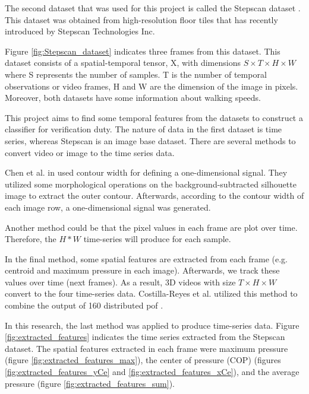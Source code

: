 The second dataset that was used for this project is called the Stepscan dataset \cite{Connor2015ComparingBiometrics}. This dataset was obtained from high-resolution floor tiles that has recently introduced by Stepscan Technologies Inc.

Figure \ref{fig:Stepscan_dataset} indicates three frames from this dataset. This dataset consists of a spatial-temporal tensor, X, with dimensions $S \times T \times H \times W$ where S represents the number of samples. T is the number of temporal observations or video frames, H and W are the dimension of the image in pixels. Moreover, both datasets have some information about walking speeds. 

This project aims to find some temporal features from the datasets to construct a classifier for verification duty. The nature of data in the first dataset is time series, whereas Stepscan is an image base dataset. There are several methods to convert video or image to the time series data.

Chen et al. in \cite{Chen2006GaitModel} used contour width  for defining a one-dimensional signal. They utilized some morphological operations on the background-subtracted silhouette image to extract the outer contour. Afterwards, according to the contour width of each image row, a one-dimensional signal was generated.

Another method could be that the pixel values in each frame are plot over time. Therefore, the $H * W$ time-series will produce for each sample.

In the final method, some spatial features are extracted from each frame (e.g. centroid and maximum pressure in each image). Afterwards, we track these values over time (next frames). As a result, 3D videos with size $T \times H \times W$ convert to the four time-series data. Costilla-Reyes et al. utilized this method to combine the output of 160 distributed \gls{pof} \cite{Costilla-Reyes2018DeepSensors}.

In this research, the last method was applied to produce time-series data. Figure \ref{fig:extracted_features} indicates the time series extracted from the Stepscan dataset. The spatial features extracted in each frame were maximum pressure (figure \ref{fig:extracted_features_max}), the center of pressure (COP) (figures \ref{fig:extracted_features_yCe} and \ref{fig:extracted_features_xCe}), and the average pressure (figure \ref{fig:extracted_features_sum}). 





